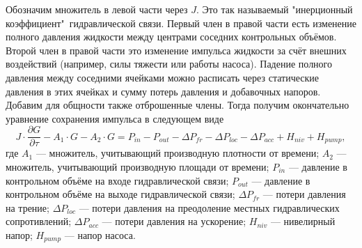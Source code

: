 Обозначим множитель в левой части через $J$. Это так называемый "инерционный коэффициент"\  гидравлической связи. Первый член в правой части есть изменение полного давления жидкости между центрами соседних контрольных объёмов. Второй член в правой части это изменение импульса жидкости за счёт внешних воздействий (например, силы тяжести или работы насоса). Падение полного давления между соседними ячейками можно расписать через статические давления в этих ячейках и сумму потерь давления и добавочных напоров. Добавим для общности также отброшенные члены. Тогда получим окончательно уравнение сохранения импульса в следующем виде
\begin{equation}
\label{formula225}
\boxed{J \cdot \frac{\partial G}{\partial\tau} - A_1 \cdot G - A_2 \cdot G = 
P_{in} - P_{out} - \Delta P_{fr} - \Delta P_{loc} - \Delta P_{acc} + H_{niv} + H_{pump}}
, 	
\end{equation} 
где $A_1$ --- множитель, учитывающий производную плотности от времени; $A_2$ --- множитель, учитывающий производную площади от времени; $P_{in}$ --- давление в контрольном объёме на входе гидравлической связи; $P_{out}$ --- давление в контрольном объёме на выходе гидравлической связи; $\Delta P_{fr}$ --- потери давления на трение; $\Delta P_{loc}$ --- потери давления на преодоление местных гидравлических сопротивлений; $\Delta P_{acc}$ --- потери давления на ускорение; $H_{niv}$ --- нивелирный напор; $H_{pump}$ --- напор насоса.

























